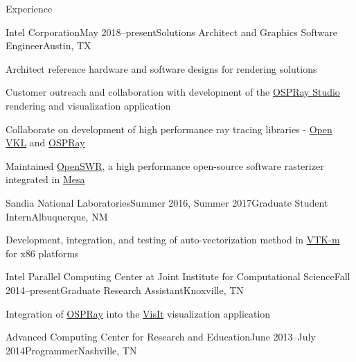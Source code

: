 \documentclass{resume} %
\begin{document}
\begin{rSection}{Experience}

\begin{rSubsection}{Intel Corporation}{May 2018--present}{Solutions Architect and Graphics Software Engineer}{Austin, TX}
    \item Architect reference hardware and software designs for rendering solutions
    \item Customer outreach and collaboration with development of the \href{https://github.com/ospray/ospray\_studio}{OSPRay Studio} rendering and visualization application
    \item Collaborate on development of high performance ray tracing libraries - \href{https://www.openvkl.org/}{Open VKL} and \href{https://www.ospray.org/}{OSPRay}
    \item Maintained \href{http://openswr.org/}{OpenSWR}, a high performance open-source software rasterizer integrated in \href{https://www.mesa3d.org/}{Mesa}
\end{rSubsection}


\begin{rSubsection}{Sandia National Laboratories}{Summer 2016, Summer 2017}{Graduate Student Intern}{Albuquerque, NM}
    \item Development, integration, and testing of auto-vectorization method in \href{http://m.vtk.org}{VTK-m} for x86 platforms
\end{rSubsection}


\begin{rSubsection}{Intel Parallel Computing Center at Joint Institute for Computational Science}{Fall 2014--present}{Graduate Research Assistant}{Knoxville, TN}
    \item Integration of \href{http://www.ospray.org/}{OSPRay} into the \href{https://visit.llnl.gov/}{VisIt} visualization application
\end{rSubsection}


\begin{rSubsectionNoList}{Advanced Computing Center for Research and Education}{June 2013--July 2014}{Programmer}{Nashville, TN}
\end{rSubsectionNoList}



\end{rSection}
\end{document}
